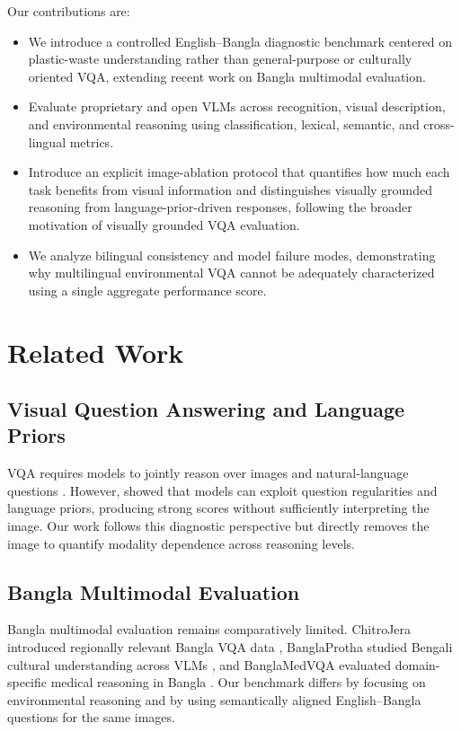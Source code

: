\documentclass{article}
\begin{document}
Our contributions are:
\begin{itemize}
    \item We introduce a controlled English--Bangla diagnostic benchmark centered on plastic-waste understanding rather than general-purpose or culturally oriented VQA, extending recent work on Bangla multimodal evaluation.

    \item Evaluate proprietary and open VLMs across recognition, visual description, and environmental reasoning using classification, lexical, semantic, and cross-lingual metrics.

    \item Introduce an explicit image-ablation protocol that quantifies how much each task benefits from visual information and distinguishes visually grounded reasoning from language-prior-driven responses, following the broader motivation of visually grounded VQA evaluation.
    \item We analyze bilingual consistency and model failure modes, demonstrating why multilingual environmental VQA cannot be adequately characterized using a single aggregate performance score.
\end{itemize}

\section{Related Work}
\label{sec:related_work}

\subsection{Visual Question Answering and Language Priors}

VQA requires models to jointly reason over images and natural-language questions \citep{antol2015vqa}. However, \citet{goyal2017makingv} showed that models can exploit question regularities and language priors, producing strong scores without sufficiently interpreting the image. Our work follows this diagnostic perspective but directly removes the image to quantify modality dependence across reasoning levels.

\subsection{Bangla Multimodal Evaluation}

Bangla multimodal evaluation remains comparatively limited. ChitroJera introduced regionally relevant Bangla VQA data \citep{barua2024chitrojera}, BanglaProtha studied Bengali cultural understanding across VLMs \citep{fahim2026banglaprotha}, and BanglaMedVQA evaluated domain-specific medical reasoning in Bangla \citep{ahmed2026banglamedvqa}. Our benchmark differs by focusing on environmental reasoning and by using semantically aligned English--Bangla questions for the same images.
\end{document}
